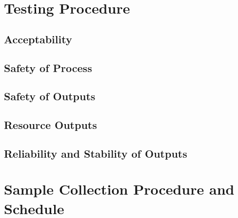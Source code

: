\section{Testing Procedure}

\subsection{Acceptability}


\subsection{Safety of Process}

\subsection{Safety of Outputs}

\subsection{Resource Outputs}

\subsection{Reliability and Stability of Outputs}

\section{Sample Collection Procedure and Schedule}
